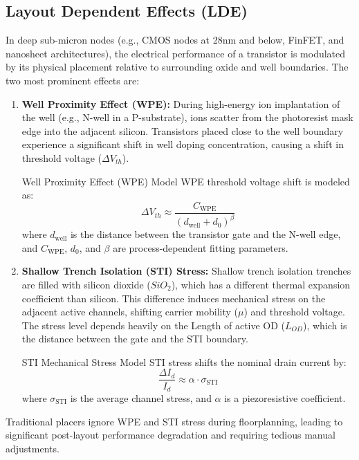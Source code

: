 \subsection{Layout Dependent Effects (LDE)}
In deep sub-micron nodes (e.g., CMOS nodes at 28nm and below, FinFET, and nanosheet architectures), the electrical performance of a transistor is modulated by its physical placement relative to surrounding oxide and well boundaries. The two most prominent effects are:
\begin{enumerate}
    \item \textbf{Well Proximity Effect (WPE):} During high-energy ion implantation of the well (e.g., N-well in a P-substrate), ions scatter from the photoresist mask edge into the adjacent silicon. Transistors placed close to the well boundary experience a significant shift in well doping concentration, causing a shift in threshold voltage ($\Delta V_{th}$).
    \begin{thesiscallout}{Well Proximity Effect (WPE) Model}
    WPE threshold voltage shift is modeled as:
    \begin{equation}
        \Delta V_{th} \approx \frac{C_{\text{WPE}}}{(d_{\text{well}} + d_0)^{\beta}}
    \end{equation}
    where $d_{\text{well}}$ is the distance between the transistor gate and the N-well edge, and $C_{\text{WPE}}$, $d_0$, and $\beta$ are process-dependent fitting parameters.
    \end{thesiscallout}
    \item \textbf{Shallow Trench Isolation (STI) Stress:} Shallow trench isolation trenches are filled with silicon dioxide ($SiO_2$), which has a different thermal expansion coefficient than silicon. This difference induces mechanical stress on the adjacent active channels, shifting carrier mobility ($\mu$) and threshold voltage. The stress level depends heavily on the Length of active OD ($L_{OD}$), which is the distance between the gate and the STI boundary.
    \begin{thesiscallout}{STI Mechanical Stress Model}
    STI stress shifts the nominal drain current by:
    \begin{equation}
        \frac{\Delta I_d}{I_d} \approx \alpha \cdot \sigma_{\text{STI}}
    \end{equation}
    where $\sigma_{\text{STI}}$ is the average channel stress, and $\alpha$ is a piezoresistive coefficient.
    \end{thesiscallout}
\end{enumerate}
Traditional placers ignore WPE and STI stress during floorplanning, leading to significant post-layout performance degradation and requiring tedious manual adjustments.

